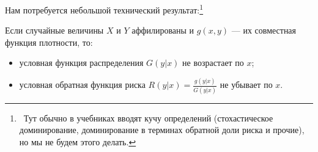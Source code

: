 Нам потребуется небольшой технический результат:\footnote{~Тут обычно в учебниках вводят кучу определений (стохастическое доминирование, доминирование в терминах обратной доли риска и прочие), но мы не будем этого делать.}
\begin{myth}
Если случайные величины $ X $ и $ Y $ аффилированы и $ g(x,y) $ — их совместная функция плотности, то:
\begin{itemize}
\item условная функция распределения $ G(y|x)$ не возрастает по $ x $;
\item условная обратная функция риска  $ R(y|x)=\frac{g(y|x)}{G(y|x)} $ не убывает по $ x $.
\end{itemize}
\end{myth}
